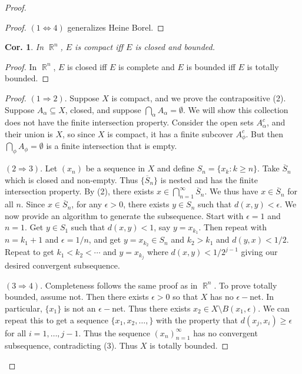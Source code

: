 \documentclass[12pt, a4paper]{book}
\DeclareMathOperator{\R}{\mathbb{R}}
\newtheorem{corollary}[theorem]{Cor.}
\theoremstyle{nonumberplain}
\newtheorem{proof}{Proof}
\begin{document}
\begin{proof}
\begin{proof}
    $(1\Leftrightarrow 4)$ generalizes Heine Borel.
\end{proof}
\begin{corollary}
    In $\R^n$, $E$ is compact iff $E$ is closed and bounded.
\end{corollary}
\begin{proof}
    In $\R^n$, $E$ is closed iff $E$ is complete and $E$ is bounded iff $E$ is totally bounded.
\end{proof}
\begin{proof}
    $(1\Rightarrow 2)$. Suppose $X$ is compact, and we prove the contrapositive (2).
    Suppose $A_\alpha\subseteq X$, closed, and suppose $\bigcap_{\alpha}A_\alpha=\emptyset$. We will
    show this collection does not have the finite intersection property. Consider the open sets $A_\alpha^c$, and their union is
    $X$, so since $X$ is compact, it has a finite subcover $A_\phi^c$. But then $\bigcap_\phi A_\phi=\emptyset$ is a finite
    intersection that is empty.

    $(2\Rightarrow 3)$. Let $(x_n)$ be a sequence in $X$ and define $S_n=\{x_k:k\geq n\}$. Take $\overline{S}_n$ which is closed
    and non-empty. Thus $\{\overline{S}_n\}$ is nested and has the finite intersection property. By (2), there exists
    $x\in\bigcap_{n=1}^\infty\overline{S}_n$. We thus have $x\in\overline{S}_n$ for all $n$. Since $x\in\overline{S}_n$,
    for any $\epsilon>0$, there exists $y\in S_n$ such that $d(x,y)<\epsilon$. We now provide an algorithm to generate the
    subsequence. Start with $\epsilon=1$ and $n=1$. Get $y\in S_1$ such that $d(x,y)<1$, say $y=x_{k_1}$.
    Then repeat with $n=k_1+1$ and $\epsilon=1/n$, and get $y=x_{k_2}\in S_n$ and $k_2>k_1$ and $d(y,x)<1/2$. Repeat to
    get $k_1<k_2<\cdots$ and $y=x_{k_j}$ where $d(x,y)<1/2^{j-1}$ giving our desired convergent subsequence.

    $(3\Rightarrow 4)$. Completeness follows the same proof as in $\R^n$. To prove totally bounded, assume not. Then there exists $\epsilon>0$ so
    that $X$ has no $\epsilon-$net. In particular, $\{x_1\}$ is not an $\epsilon-$net. Thus there exists $x_2\in X\setminus B(x_1,\epsilon)$.
    We can repeat this to get a sequence $\{x_1,x_2,\ldots,\}$ with the property that $d(x_j,x_i)\geq\epsilon$ for all $i=1,\ldots,j-1$.
    Thus the sequence $(x_n)_{n=1}^\infty$ has no convergent subsequence, contradicting (3). Thus $X$ is totally bounded.


\end{proof}
\end{proof}
\end{document}
